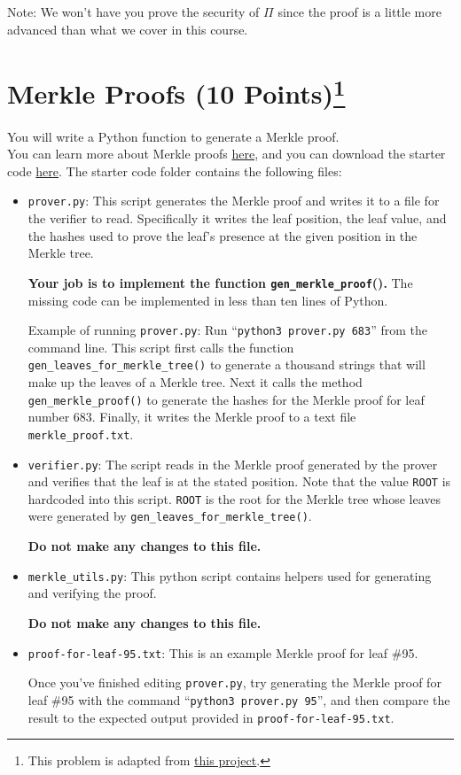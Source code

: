 \documentclass[11pt]{article}
\numberwithin{equation}{section}
\begin{document}
Note: We won't have you prove the security of $\Pi$ since the proof is a little more advanced than what we cover in this course. \\
\pagebreak


\section{Merkle Proofs (10 Points)\footnote{This problem is adapted from \href{https://cs251.stanford.edu/hw/proj1.pdf}{this project}.}}
You will write a Python function to generate a Merkle proof.\\ 

\noindent You can learn more about Merkle proofs \href{https://decentralizedthoughts.github.io/2020-12-22-what-is-a-merkle-tree/}{here}, and you can download the starter code \href{https://eecs171.com/assets/homework/hw9.zip}{here}. The starter code folder contains the following files:
\begin{itemize}
    \item \texttt{prover.py}: This script generates the Merkle proof and writes it to a file for the verifier to read. Specifically it writes the leaf position, the leaf value, and the hashes used to prove the leaf’s presence at the given position in the Merkle tree.

    \textbf{Your job is to implement the function \texttt{gen\_merkle\_proof}().} The missing code can be implemented in less than ten lines of Python.

    Example of running \texttt{prover.py}: Run ``\texttt{python3 prover.py 683}'' from the command line. This script first calls the function \texttt{gen\_leaves\_for\_merkle\_tree()} to generate a thousand strings that will make up the leaves of a Merkle tree. Next it calls the method \texttt{gen\_merkle\_proof()} to generate the hashes for the Merkle proof for leaf number 683. Finally, it writes the Merkle proof to a text file \texttt{merkle\_proof.txt}.

    \item \texttt{verifier.py}: The script reads in the Merkle proof generated by the prover and verifies that the leaf is at the stated position. Note that the value \texttt{ROOT} is hardcoded into this script. \texttt{ROOT} is the root for the Merkle tree whose leaves were generated by \texttt{gen\_leaves\_for\_merkle\_tree()}.
    
    \textbf{Do not make any changes to this file.} 
    
    \item \texttt{merkle\_utils.py}: This python script contains helpers used for generating and verifying the proof. 
    
    \textbf{Do not make any changes to this file.}

    \item \texttt{proof-for-leaf-95.txt}: This is an example Merkle proof for leaf \#95. 
    
    Once you've finished editing \texttt{prover.py}, try generating the Merkle proof for leaf \#95 with the command ``\texttt{python3 prover.py 95}'', and then compare the result to the expected output provided in \texttt{proof-for-leaf-95.txt}.
\end{itemize}
\end{document}
